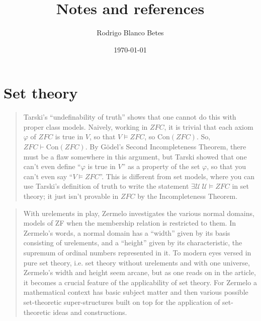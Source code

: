\documentclass[11pt,a4paper]{article}
\title{\textbf{Notes and references}}
\author{Rodrigo Blanco Betes}
\date{\today}
\begin{document}
\section{Set theory}

\begin{quote}
\small
Tarski's ``undefinability of truth'' shows that one cannot do this with proper class models. Naively, working in $ZFC$, it is trivial that each axiom $\varphi$ of $ZFC$ is true in $V$, so that $V \models ZFC$, so $\mathrm{Con}(ZFC)$. So, $ZFC \vdash \mathrm{Con}(ZFC)$. By Gödel's Second Incompleteness Theorem, there must be a flaw somewhere in this argument, but Tarski showed that one can't even define ``$\varphi$ is true in $V$'' as a property of the set $\varphi$, so that you can't even say ``$V \models ZFC$''. This is different from set models, where you can use Tarski's definition of truth to write the statement $\exists \mathcal{U}\ \mathcal{U} \models ZFC$ in set theory; it just isn't provable in $ZFC$ by the Incompleteness Theorem. \textcite[84]{Kunen2011}
\end{quote}

\begin{quote}
  \small
  With urelements in play, Zermelo investigates the various normal domains, models of ZF when the membership relation is restricted to them. In Zermelo’s words, a normal domain has a “width” given by its basis consisting of urelements, and a “height” given by its characteristic, the supremum of ordinal numbers represented in it. To modern eyes versed in pure set theory, i.e. set theory without urelements and with one universe, Zermelo’s width and height seem arcane, but as one reads on in the article, it becomes a crucial feature of the applicability of set theory. For Zermelo a mathematical context has basic subject matter and then various possible set-theoretic super-structures built on top for the application of set-theoretic ideas and constructions. \textcite[p. 392]{kanamori2010introduction}
\end{quote}



\printbibliography
\end{document}
